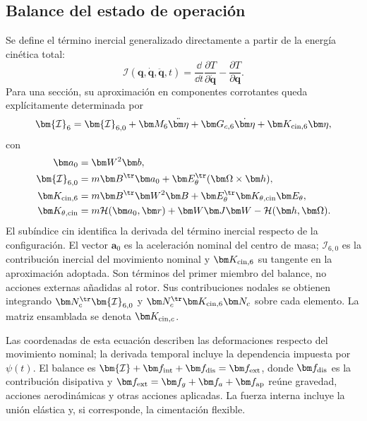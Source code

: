 \subsection{Balance del estado de operación}
Se define el término inercial generalizado directamente a partir de la energía cinética total:
\begin{equation}
\bm{\mathcal I}(\bm q,\dot{\bm q},\ddot{\bm q},t)
=\frac{\dd}{\dd t}\frac{\partial T}{\partial\dot{\bm q}}
-\frac{\partial T}{\partial\bm q}.
\label{eq:inercia-generalizada}
\end{equation}
Para una sección, su aproximación en componentes corrotantes queda explícitamente determinada por
\begin{equation}
\bm{\mathcal I}_6=
\bm{\mathcal I}_{6,0}
+\bm M_6\ddot{\bm\eta}
+\bm G_{c,6}\dot{\bm\eta}
+\bm K_{{\rm cin},6}\bm\eta,
\label{eq:balance-inercial}
\end{equation}
con
\begin{align}
\bm a_0&=\bm W^2\bm b,\nonumber\\
\bm{\mathcal I}_{6,0}
&=m\bm B^\tr\bm a_0+\bm E_\theta^\tr(\bm\Omega\times\bm h),\nonumber\\
\bm K_{{\rm cin},6}
&=m\bm B^\tr\bm W^2\bm B
+\bm E_\theta^\tr\bm K_{\theta,{\rm cin}}\bm E_\theta,\nonumber\\
\bm K_{\theta,{\rm cin}}
&=m\mathcal H(\bm a_0,\bm r)+\bm W\bm J\bm W
-\mathcal H(\bm h,\bm\Omega).
\label{eq:tangente-inercial}
\end{align}
El subíndice $\mathrm{cin}$ identifica la derivada del término inercial respecto de la configuración. El vector $\bm a_0$ es la aceleración nominal del centro de masa; $\bm{\mathcal I}_{6,0}$ es la contribución inercial del movimiento nominal y $\bm K_{{\rm cin},6}$ su tangente en la aproximación adoptada. Son términos del primer miembro del balance, no acciones externas añadidas al rotor. Sus contribuciones nodales se obtienen integrando $\bm N_c^\tr\bm{\mathcal I}_{6,0}$ y $\bm N_c^\tr\bm K_{{\rm cin},6}\bm N_c$ sobre cada elemento. La matriz ensamblada se denota $\bm K_{{\rm cin},c}$.

Las coordenadas de esta ecuación describen las deformaciones respecto del movimiento nominal; la derivada temporal incluye la dependencia impuesta por $\psi(t)$. El balance es
$\bm{\mathcal I}+\bm f_{\rm int}+\bm f_{\rm dis}=\bm f_{\rm ext}$,
donde $\bm f_{\rm dis}$ es la contribución disipativa y $\bm f_{\rm ext}=\bm f_g+\bm f_a+\bm f_{\rm ap}$ reúne gravedad, acciones aerodinámicas y otras acciones aplicadas. La fuerza interna incluye la unión elástica y, si corresponde, la cimentación flexible.

